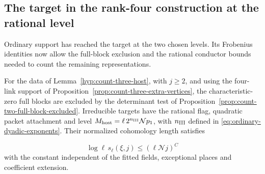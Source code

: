 \subsection{The target in the rank-four construction at the rational level}
\label{sec:count-three-target}

Ordinary support has reached the target at the two chosen levels. Its Frobenius identities now allow the full-block exclusion and the rational conductor bounds needed to count the remaining representations.

\begin{proposition}\label{prop:count-three-host-output}
For the data of Lemma~\ref{hyp:count-three-host}, with \(j\ge2\), and
using the four-link support of Proposition~\ref{prop:count-three-extra-vertices},
the characteristic-zero full blocks are excluded by the determinant test
of Proposition~\ref{prop:count-two-full-block-excluded}. Irreducible
targets have the rational flag, quadratic packet attachment and
level \(M_{\mathrm{host}}=\ell\,2^{n_{\rm III}}\mathcal Np_1\), with
\(n_{\rm III}\) defined in \eqref{eq:ordinary-dyadic-exponents}. Their normalized cohomology length satisfies

\[
 \log\ell\,s_\ell(\xi,j)\le(\ell\mathcal N j)^C
\]
 with the
constant independent of the fitted fields, exceptional places
and coefficient extension.
\end{proposition}

